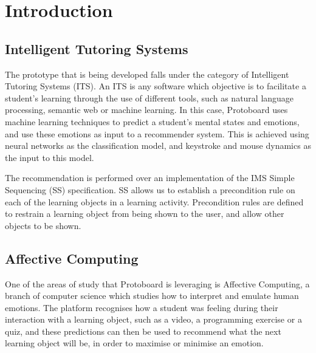 \documentclass{acm_proc_article-sp}
\begin{document}




\section{Introduction}

\subsection{Intelligent Tutoring Systems}
\label{ITSs}

The prototype that is being developed falls under the category of
Intelligent Tutoring Systems (ITS). An ITS is any software which
objective is to facilitate a student's learning through the use of
different tools, such as natural language processing, semantic web or
machine learning. In this case, Protoboard uses machine learning
techniques to predict a student's mental states and emotions, and use
these emotions as input to a recommender system. This is achieved
using neural networks as the classification model, and keystroke and
mouse dynamics as the input to this model.

The recommendation is performed over an implementation of the IMS Simple
Sequencing (SS) specification. SS allows us to establish a precondition
rule on each of the learning objects in a learning
activity. Precondition rules are defined to restrain a learning object
from being shown to the user, and allow other objects to be shown.


\subsection{Affective Computing}
One of the areas of study that Protoboard is leveraging is Affective
Computing, a branch of computer science which studies how to interpret
and emulate human emotions. The platform recognises how a student was
feeling during their interaction with a learning object, such as a
video, a programming exercise or a quiz, and these predictions can
then be used to recommend what the next learning object will be, in
order to maximise or minimise an emotion.
\end{document}
